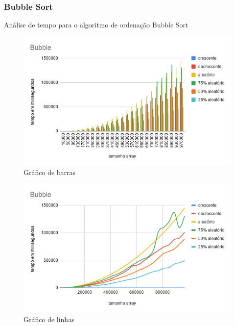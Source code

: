 \documentclass[a4paper, 12pt]{article}
\begin{document}
	\newpage
\subsubsection{Bubble Sort}
		 Análise de tempo para o algoritmo de ordenação Bubble Sort

\begin{figure}[!h]
	\caption{ Gráfico de barras }
	    \label{fig:bubble1}
	\centering
	\includegraphics[width=1.1\textwidth, height=0.60\textwidth]{Bubble}
\end{figure}

	\begin{figure}[!h]
	\caption{ Gráfico de linhas }
	\label{fig:bubble2}
	\centering
	\includegraphics[width=1.1\textwidth, height=0.57\textwidth]{Bubble_linha}
\end{figure}
\end{document}
